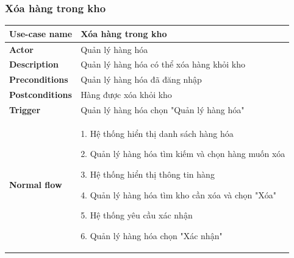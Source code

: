         \subsubsection{Xóa hàng trong kho}
            \begin{longtable}{| p{} | p{} |} 
                \hline
                    \textbf{Use-case name} 
                & 
                    Xóa hàng trong kho
                \\
                \hline
                    \textbf{Actor} 
                & 
                    Quản lý hàng hóa
                \\
                \hline
                    \textbf{Description} 
                & 
                    Quản lý hàng hóa có thể xóa hàng khỏi kho
                \\
                \hline
                    \textbf{Preconditions} 
                &
                    Quản lý hàng hóa đã đăng nhập
                \\
                \hline
                    \textbf{Postconditions} 
                & 
                    Hàng được xóa khỏi kho
                \\
                \hline
                    \textbf{Trigger} 
                & 
                    Quản lý hàng hóa chọn "Quản lý hàng hóa"
                \\
                \hline
                \begin{flushleft}
                    \textbf{Normal flow}
                \end{flushleft}
                & 
                1. Hệ thống hiển thị danh sách hàng hóa
                    
                    2. Quản lý hàng hóa tìm kiếm và chọn hàng muốn xóa
                    
                    3. Hệ thống hiển thị thông tin hàng
                    
                    4. Quản lý hàng hóa tìm kho cần xóa và chọn "Xóa"
                    
                    5. Hệ thống yêu cầu xác nhận
                    
                    6. Quản lý hàng hóa chọn "Xác nhận"
                    

\end{longtable}
